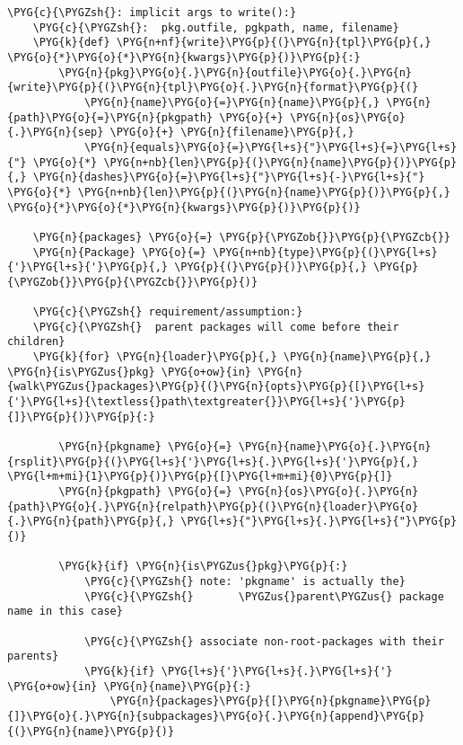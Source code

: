 \begin{Verbatim}[commandchars=\\\{\}]
    \PYG{c}{\PYGZsh{}: implicit args to write():}
    \PYG{c}{\PYGZsh{}:  pkg.outfile, pgkpath, name, filename}
    \PYG{k}{def} \PYG{n+nf}{write}\PYG{p}{(}\PYG{n}{tpl}\PYG{p}{,} \PYG{o}{*}\PYG{o}{*}\PYG{n}{kwargs}\PYG{p}{)}\PYG{p}{:}
        \PYG{n}{pkg}\PYG{o}{.}\PYG{n}{outfile}\PYG{o}{.}\PYG{n}{write}\PYG{p}{(}\PYG{n}{tpl}\PYG{o}{.}\PYG{n}{format}\PYG{p}{(}
            \PYG{n}{name}\PYG{o}{=}\PYG{n}{name}\PYG{p}{,} \PYG{n}{path}\PYG{o}{=}\PYG{n}{pkgpath} \PYG{o}{+} \PYG{n}{os}\PYG{o}{.}\PYG{n}{sep} \PYG{o}{+} \PYG{n}{filename}\PYG{p}{,}
            \PYG{n}{equals}\PYG{o}{=}\PYG{l+s}{"}\PYG{l+s}{=}\PYG{l+s}{"} \PYG{o}{*} \PYG{n+nb}{len}\PYG{p}{(}\PYG{n}{name}\PYG{p}{)}\PYG{p}{,} \PYG{n}{dashes}\PYG{o}{=}\PYG{l+s}{"}\PYG{l+s}{-}\PYG{l+s}{"} \PYG{o}{*} \PYG{n+nb}{len}\PYG{p}{(}\PYG{n}{name}\PYG{p}{)}\PYG{p}{,} \PYG{o}{*}\PYG{o}{*}\PYG{n}{kwargs}\PYG{p}{)}\PYG{p}{)}

    \PYG{n}{packages} \PYG{o}{=} \PYG{p}{\PYGZob{}}\PYG{p}{\PYGZcb{}}
    \PYG{n}{Package} \PYG{o}{=} \PYG{n+nb}{type}\PYG{p}{(}\PYG{l+s}{'}\PYG{l+s}{'}\PYG{p}{,} \PYG{p}{(}\PYG{p}{)}\PYG{p}{,} \PYG{p}{\PYGZob{}}\PYG{p}{\PYGZcb{}}\PYG{p}{)}

    \PYG{c}{\PYGZsh{} requirement/assumption:}
    \PYG{c}{\PYGZsh{}  parent packages will come before their children}
    \PYG{k}{for} \PYG{n}{loader}\PYG{p}{,} \PYG{n}{name}\PYG{p}{,} \PYG{n}{is\PYGZus{}pkg} \PYG{o+ow}{in} \PYG{n}{walk\PYGZus{}packages}\PYG{p}{(}\PYG{n}{opts}\PYG{p}{[}\PYG{l+s}{'}\PYG{l+s}{\textless{}path\textgreater{}}\PYG{l+s}{'}\PYG{p}{]}\PYG{p}{)}\PYG{p}{:}

        \PYG{n}{pkgname} \PYG{o}{=} \PYG{n}{name}\PYG{o}{.}\PYG{n}{rsplit}\PYG{p}{(}\PYG{l+s}{'}\PYG{l+s}{.}\PYG{l+s}{'}\PYG{p}{,} \PYG{l+m+mi}{1}\PYG{p}{)}\PYG{p}{[}\PYG{l+m+mi}{0}\PYG{p}{]}
        \PYG{n}{pkgpath} \PYG{o}{=} \PYG{n}{os}\PYG{o}{.}\PYG{n}{path}\PYG{o}{.}\PYG{n}{relpath}\PYG{p}{(}\PYG{n}{loader}\PYG{o}{.}\PYG{n}{path}\PYG{p}{,} \PYG{l+s}{"}\PYG{l+s}{.}\PYG{l+s}{"}\PYG{p}{)}

        \PYG{k}{if} \PYG{n}{is\PYGZus{}pkg}\PYG{p}{:}
            \PYG{c}{\PYGZsh{} note: 'pkgname' is actually the}
            \PYG{c}{\PYGZsh{}       \PYGZus{}parent\PYGZus{} package name in this case}

            \PYG{c}{\PYGZsh{} associate non-root-packages with their parents}
            \PYG{k}{if} \PYG{l+s}{'}\PYG{l+s}{.}\PYG{l+s}{'} \PYG{o+ow}{in} \PYG{n}{name}\PYG{p}{:}
                \PYG{n}{packages}\PYG{p}{[}\PYG{n}{pkgname}\PYG{p}{]}\PYG{o}{.}\PYG{n}{subpackages}\PYG{o}{.}\PYG{n}{append}\PYG{p}{(}\PYG{n}{name}\PYG{p}{)}


\end{Verbatim}

